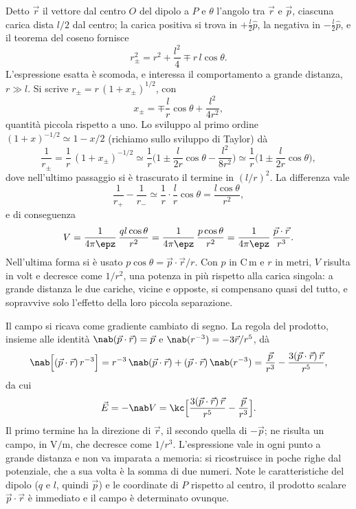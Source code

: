 \documentclass[main.tex]{subfiles}
\begin{document}
	Detto $\vec r$ il vettore dal centro $O$ del dipolo a $P$ e $\theta$ l'angolo tra $\vec r$ e $\vec p$, ciascuna carica dista $l/2$ dal centro; la carica positiva si trova in $+\tfrac{l}{2}\hat p$, la negativa in $-\tfrac{l}{2}\hat p$, e il teorema del coseno fornisce
	\[
	r_\pm^2=r^2+\frac{l^2}{4}\mp r\,l\cos\theta .
	\]
	L'espressione esatta è scomoda, e interessa il comportamento a grande distanza, $r\gg l$. Si scrive $r_\pm=r\,(1+x_\pm)^{1/2}$, con
	\[
	x_\pm=\mp\frac{l}{r}\cos\theta+\frac{l^2}{4r^2},
	\]
	quantità piccola rispetto a uno. Lo sviluppo al primo ordine $(1+x)^{-1/2}\simeq1-x/2$ (richiamo sullo sviluppo di Taylor) dà
	\[
	\frac1{r_\pm}=\frac1r\,(1+x_\pm)^{-1/2}\simeq\frac1r\Big(1\pm\frac{l}{2r}\cos\theta-\frac{l^2}{8r^2}\Big)\simeq\frac1r\Big(1\pm\frac{l}{2r}\cos\theta\Big),
	\]
	dove nell'ultimo passaggio si è trascurato il termine in $(l/r)^2$. La differenza vale
	\[
	\frac1{r_+}-\frac1{r_-}\simeq\frac1r\cdot\frac{l}{r}\cos\theta=\frac{l\cos\theta}{r^2},
	\]
	e di conseguenza
	\begin{equation}\label{eq:pot:Vdipolo}
		V=\frac{1}{4\pi\epz}\,\frac{ql\cos\theta}{r^2}=\frac{1}{4\pi\epz}\,\frac{p\cos\theta}{r^2}=\frac{1}{4\pi\epz}\,\frac{\vec p\cdot\vec r}{r^3}.
	\end{equation}
	Nell'ultima forma si è usato $p\cos\theta=\vec p\cdot\vec r/r$. Con $p$ in $\mathrm{C\,m}$ e $r$ in metri, $V$ risulta in volt e decresce come $1/r^2$, una potenza in più rispetto alla carica singola: a grande distanza le due cariche, vicine e opposte, si compensano quasi del tutto, e sopravvive solo l'effetto della loro piccola separazione.
	
	Il campo si ricava come gradiente cambiato di segno. La regola del prodotto, insieme alle identità $\nab(\vec p\cdot\vec r)=\vec p$ e $\nab(r^{-3})=-3\vec r/r^5$, dà
	\[
	\nab\Big[(\vec p\cdot\vec r)\,r^{-3}\Big]=r^{-3}\,\nab(\vec p\cdot\vec r)+(\vec p\cdot\vec r)\,\nab(r^{-3})=\frac{\vec p}{r^3}-\frac{3(\vec p\cdot\vec r)\,\vec r}{r^5},
	\]
	da cui
	\begin{equation}\label{eq:pot:Edipolo}
		\vec E=-\nab V=\kc\Big[\frac{3(\vec p\cdot\vec r)\,\vec r}{r^5}-\frac{\vec p}{r^3}\Big].
	\end{equation}
	Il primo termine ha la direzione di $\vec r$, il secondo quella di $-\vec p$; ne risulta un campo, in $\mathrm{V/m}$, che decresce come $1/r^3$. L'espressione vale in ogni punto a grande distanza e non va imparata a memoria: si ricostruisce in poche righe dal potenziale, che a sua volta è la somma di due numeri. Note le caratteristiche del dipolo ($q$ e $l$, quindi $\vec p$) e le coordinate di $P$ rispetto al centro, il prodotto scalare $\vec p\cdot\vec r$ è immediato e il campo è determinato ovunque.
	
\end{document}
